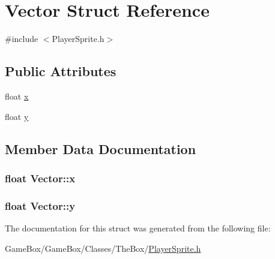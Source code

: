 \hypertarget{struct_vector}{\section{\-Vector \-Struct \-Reference}
\label{struct_vector}
}


{\ttfamily \#include $<$\-Player\-Sprite.\-h$>$}

\subsection*{\-Public \-Attributes}
\begin{DoxyCompactItemize}
\item 
float \hyperlink{struct_vector_aca49165049a1e21ae47afcfc078819ed}{x}
\item 
float \hyperlink{struct_vector_a81be9102fca6d9beea3efef522c4c09d}{y}
\end{DoxyCompactItemize}


\subsection{\-Member \-Data \-Documentation}
\hypertarget{struct_vector_aca49165049a1e21ae47afcfc078819ed}{
\subsubsection[{x}]{\setlength{\rightskip}{0pt plus 5cm}float {\bf \-Vector\-::x}}}\label{struct_vector_aca49165049a1e21ae47afcfc078819ed}
\hypertarget{struct_vector_a81be9102fca6d9beea3efef522c4c09d}{
\subsubsection[{y}]{\setlength{\rightskip}{0pt plus 5cm}float {\bf \-Vector\-::y}}}\label{struct_vector_a81be9102fca6d9beea3efef522c4c09d}


\-The documentation for this struct was generated from the following file\-:\begin{DoxyCompactItemize}
\item 
\-Game\-Box/\-Game\-Box/\-Classes/\-The\-Box/\hyperlink{_player_sprite_8h}{\-Player\-Sprite.\-h}\end{DoxyCompactItemize}
